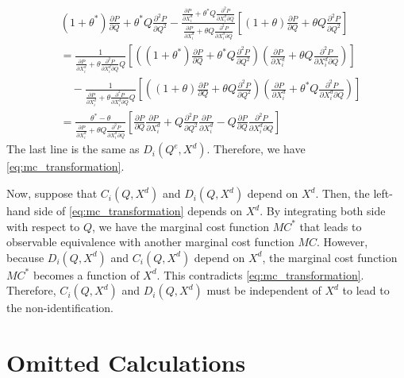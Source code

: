 \documentclass[11pt, a4paper]{article}
\theoremstyle{remark}
\begin{document}
\begin{align}
    & (1+ \theta^{*})\frac{\partial P}{\partial Q} + \theta^{*} Q\frac{\partial^2 P}{\partial Q^2} - \frac{\frac{\partial P}{\partial X^{d}_i} + \theta^{*} Q\frac{\partial^2 P}{\partial X^{d}_{i}\partial Q} }{\frac{\partial P}{\partial X^{d}_i} + \theta Q\frac{\partial^2 P}{\partial X^{d}_{i}\partial Q} }\left[(1+ \theta) \frac{\partial P}{\partial Q} + \theta Q\frac{\partial^2 P}{\partial Q^2}\right]\\
    &= \frac{1}{\frac{\partial P}{\partial X^{d}_i} + \theta\frac{\partial^2 P}{\partial X^{d}_{i}\partial Q}Q}\left[\left((1 + \theta^{*}) \frac{\partial P}{\partial Q} + \theta^{*} Q\frac{\partial^2 P}{\partial  Q^2}\right)\left(\frac{\partial P}{\partial X^{d}_i} + \theta Q\frac{\partial^2 P}{\partial X^{d}_{i}\partial Q}\right)\right]\\
    &\quad - \frac{1}{\frac{\partial P}{\partial X^{d}_i} + \theta\frac{\partial^2 P}{\partial X^{d}_{i}\partial Q}Q}\left[\left( (1 + \theta) \frac{\partial P}{\partial Q} + \theta Q\frac{\partial^2 P}{\partial Q^2}\right)\left(\frac{\partial P}{\partial X^{d}_i} + \theta^{*} Q\frac{\partial^2 P}{\partial X^{d}_{i}\partial Q}\right)\right]\\
    & = \frac{\theta^{*} - \theta}{\frac{\partial P}{\partial X^{d}_i} + \theta Q\frac{\partial^2 P}{\partial X^{d}_{i}\partial Q}}\left[\frac{\partial P}{\partial Q} \frac{\partial P}{\partial X^{d}_i} + Q\frac{\partial^2 P}{\partial Q^2} \frac{\partial P}{\partial X^{d}_i} - Q \frac{\partial P}{\partial Q} \frac{\partial^2 P}{\partial X^{d}_i\partial Q} \right]
\end{align}
The last line is the same as $D_i(Q^e, X^{d})$.
Therefore, we have \eqref{eq:mc_transformation}.

Now, suppose that $C_i(Q, X^{d})$ and $D_i(Q, X^{d})$ depend on $X^{d}$.
Then, the left-hand side of \eqref{eq:mc_transformation} depends on $X^{d}$.
By integrating both side with respect to $Q$, we have the marginal cost function $MC^{*}$ that leads to observable equivalence with another marginal cost function $MC$.
However, because $D_i(Q, X^{d})$ and $C_i(Q, X^{d})$ depend on $X^{d}$, the marginal cost function $MC^{*}$ becomes a function of $X^{d}$.
This contradicts \eqref{eq:mc_transformation}.
Therefore, $C_i(Q, X^{d})$ and $D_i(Q, X^{d})$ must be independent of $X^{d}$ to lead to the non-identification.

\section{Omitted Calculations}\label{omitted_calculation}
\end{document}
